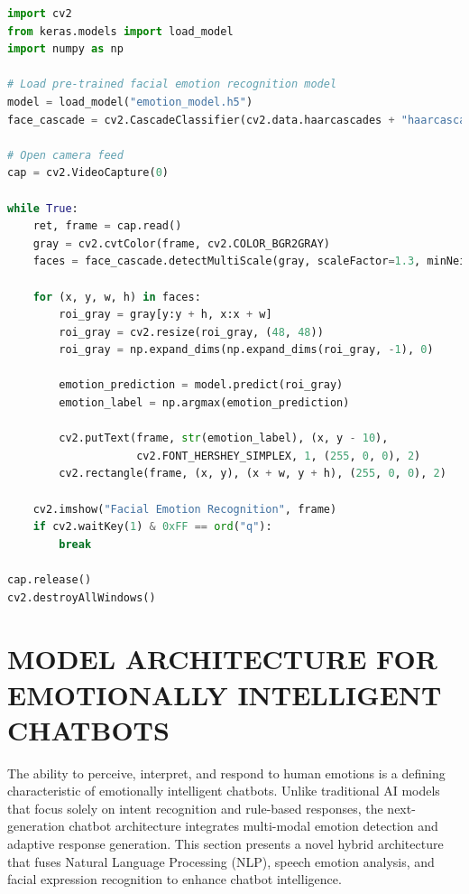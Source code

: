 \documentclass[a4paper,10pt]{article}
\begin{document}
\begin{lstlisting}[language=Python, caption=Facial Emotion Recognition Using CNNs, label=lst:cnn_emotion, basicstyle=\ttfamily\footnotesize, keywordstyle=\color{blue}, commentstyle=\color{green}, stringstyle=\color{red}]
import cv2
from keras.models import load_model
import numpy as np

# Load pre-trained facial emotion recognition model
model = load_model("emotion_model.h5")
face_cascade = cv2.CascadeClassifier(cv2.data.haarcascades + "haarcascade_frontalface_default.xml")

# Open camera feed
cap = cv2.VideoCapture(0)

while True:
    ret, frame = cap.read()
    gray = cv2.cvtColor(frame, cv2.COLOR_BGR2GRAY)
    faces = face_cascade.detectMultiScale(gray, scaleFactor=1.3, minNeighbors=5)

    for (x, y, w, h) in faces:
        roi_gray = gray[y:y + h, x:x + w]
        roi_gray = cv2.resize(roi_gray, (48, 48))
        roi_gray = np.expand_dims(np.expand_dims(roi_gray, -1), 0)
        
        emotion_prediction = model.predict(roi_gray)
        emotion_label = np.argmax(emotion_prediction)
        
        cv2.putText(frame, str(emotion_label), (x, y - 10),
                    cv2.FONT_HERSHEY_SIMPLEX, 1, (255, 0, 0), 2)
        cv2.rectangle(frame, (x, y), (x + w, y + h), (255, 0, 0), 2)

    cv2.imshow("Facial Emotion Recognition", frame)
    if cv2.waitKey(1) & 0xFF == ord("q"):
        break

cap.release()
cv2.destroyAllWindows()
\end{lstlisting}



\section{MODEL ARCHITECTURE FOR EMOTIONALLY INTELLIGENT CHATBOTS}

The ability to perceive, interpret, and respond to human emotions is a defining characteristic of emotionally intelligent chatbots. Unlike traditional AI models that focus solely on intent recognition and rule-based responses, the next-generation chatbot architecture integrates multi-modal emotion detection and adaptive response generation. This section presents a novel hybrid architecture that fuses Natural Language Processing (NLP), speech emotion analysis, and facial expression recognition to enhance chatbot intelligence.
\end{document}
